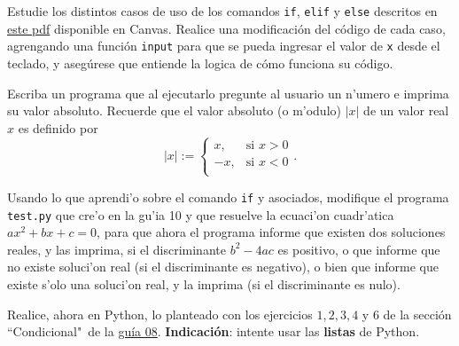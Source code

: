\documentclass[11pt]{exam}
\begin{document}
\firstpageheadrule
\runningheadrule
{}
\cfoot{ }
\begin{flushleft}
\vspace{0.2in}

\vspace{0.25cm}
\end{flushleft}

\begin{questions}


\item Estudie los distintos casos de uso de los comandos \texttt{if}, \texttt{elif} y \texttt{else} descritos en \href{https://udec.instructure.com/courses/17852/files/folder/Python?preview=1040768}{este pdf} disponible en Canvas. Realice una modificación del código de cada caso, agrengando una función \texttt{input} para que se pueda ingresar el valor de \texttt{x} desde el teclado, y asegúrese que entiende la logica de cómo funciona su código.

\item Escriba un programa que al ejecutarlo pregunte al usuario un n'umero e imprima su valor absoluto. Recuerde que el valor absoluto (o m'odulo) $|x|$ de un valor real $x$ es definido por
\begin{equation}
|x|:=\left\{\begin{array}{cl}
x, &\text{si } x>0 \\
-x, & \text{si } x<0 \\
\end{array}\right. .
\end{equation}

\item Usando lo que aprendi'o sobre el comando \texttt{if} y asociados, modifique el programa \texttt{test.py} que cre'o en la gu'ia 10 y que resuelve la ecuaci'on cuadr'atica $ax^2+bx+c=0$, para que ahora el programa informe que existen dos soluciones reales, y las imprima, si el discriminante $b^2-4ac$ es positivo, o que informe que no existe soluci'on real (si el discriminante es negativo), o bien que informe que existe s'olo una soluci'on real, y la imprima (si el discriminante es nulo).

\item Realice, ahora en Python, lo planteado con los ejercicios $1,2,3,4$ y $6$ de la sección ``Condicional"\, de la \href{https://udec.instructure.com/courses/17852/files/1301010?module_item_id=673055}{guía 08}. \textbf{Indicación}: intente usar las \textbf{listas} de Python.


\end{questions}
\end{document}
